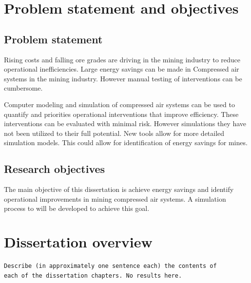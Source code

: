 	\section{Problem statement and objectives}
	\subsection{Problem statement}
 		Rising costs and falling ore grades are driving in the mining industry to reduce operational inefficiencies. Large energy savings can be made in Compressed air systems in the mining industry. However manual testing of interventions can be cumbersome.
 		\par
 		Computer modeling and simulation of compressed air systems can be used to quantify and priorities operational interventions that improve efficiency. These interventions can be evaluated with minimal risk. However simulations they have not been utilized to their full potential. New tools allow for more detailed simulation models. This could allow for identification of energy savings for mines.
	\subsection{Research objectives}
		The main objective of this dissertation is achieve energy savings and identify operational improvements in mining compressed air systems. A simulation process to will be developed to achieve this goal.
\section{Dissertation overview}
	\texttt{Describe (in approximately one sentence each) the contents of \\each of the dissertation chapters. No results here.}